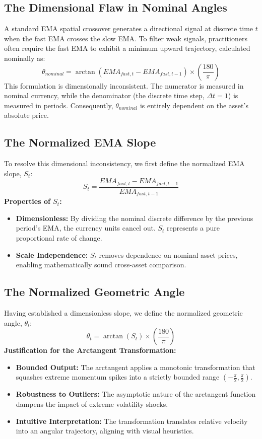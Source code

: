\documentclass[conference]{IEEEtran}
\begin{document}
\subsection{The Dimensional Flaw in Nominal Angles}
A standard EMA spatial crossover generates a directional signal at discrete time $t$ when the fast EMA crosses the slow EMA. To filter weak signals, practitioners often require the fast EMA to exhibit a minimum upward trajectory, calculated nominally as:
\begin{equation}
\theta_{nominal} = \arctan\left(EMA_{fast, t} - EMA_{fast, t-1}\right) \times \left(\frac{180}{\pi}\right)
\end{equation}
This formulation is dimensionally inconsistent. The numerator is measured in nominal currency, while the denominator (the discrete time step, $\Delta t = 1$) is measured in periods. Consequently, $\theta_{nominal}$ is entirely dependent on the asset's absolute price.

\subsection{The Normalized EMA Slope}
To resolve this dimensional inconsistency, we first define the normalized EMA slope, $S_t$:
\begin{equation}
S_t = \frac{EMA_{fast, t} - EMA_{fast, t-1}}{EMA_{fast, t-1}}
\end{equation}
\textbf{Properties of $S_t$:}
\begin{itemize}
    \item \textbf{Dimensionless:} By dividing the nominal discrete difference by the previous period's EMA, the currency units cancel out. $S_t$ represents a pure proportional rate of change.
    \item \textbf{Scale Independence:} $S_t$ removes dependence on nominal asset prices, enabling mathematically sound cross-asset comparison.
\end{itemize}

\subsection{The Normalized Geometric Angle}
Having established a dimensionless slope, we define the normalized geometric angle, $\theta_t$:
\begin{equation}
\theta_t = \arctan(S_t) \times \left(\frac{180}{\pi}\right)
\end{equation}
\textbf{Justification for the Arctangent Transformation:}
\begin{itemize}
    \item \textbf{Bounded Output:} The arctangent applies a monotonic transformation that squashes extreme momentum spikes into a strictly bounded range $(-\frac{\pi}{2}, \frac{\pi}{2})$.
    \item \textbf{Robustness to Outliers:} The asymptotic nature of the arctangent function dampens the impact of extreme volatility shocks.
    \item \textbf{Intuitive Interpretation:} The transformation translates relative velocity into an angular trajectory, aligning with visual heuristics.
\end{itemize}
\end{document}
